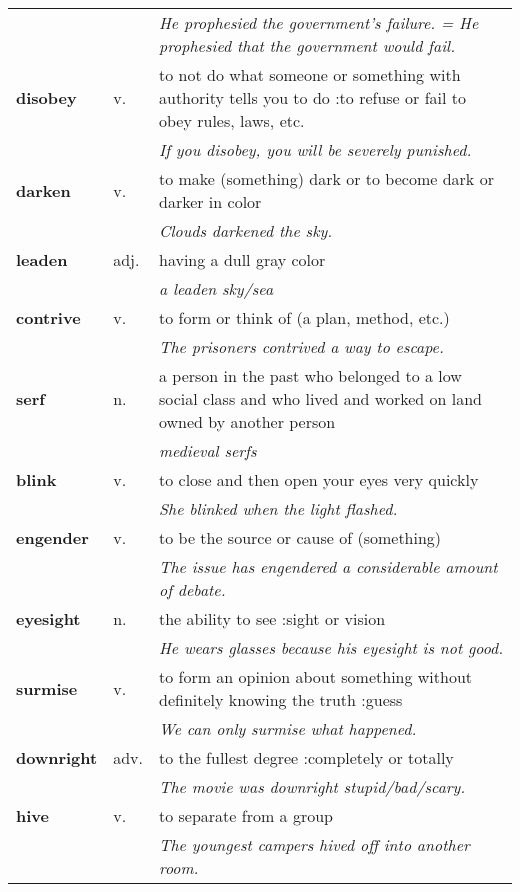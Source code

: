 \documentclass[a4paper]{article}
\begin{document}
\begin{longtable}{llp{11cm}}
 & & \textit{He prophesied the government's failure. = He prophesied that the government would fail.}\\[0.08cm]
\textbf{disobey} & v. &  to not do what someone or something with authority tells you to do :to refuse or fail to obey rules, laws, etc. \\
 & & \textit{If you disobey, you will be severely punished.}\\[0.08cm]
\textbf{darken} & v. &  to make (something) dark or to become dark or darker in color \\
 & & \textit{Clouds darkened the sky.}\\[0.08cm]
\textbf{leaden} & adj. &  having a dull gray color \\
 & & \textit{a leaden sky/sea}\\[0.08cm]
\textbf{contrive} & v. &  to form or think of (a plan, method, etc.) \\
 & & \textit{The prisoners contrived a way to escape.}\\[0.08cm]
\textbf{serf} & n. &  a person in the past who belonged to a low social class and who lived and worked on land owned by another person \\
 & & \textit{medieval serfs}\\[0.08cm]
\textbf{blink} & v. &  to close and then open your eyes very quickly \\
 & & \textit{She blinked when the light flashed.}\\[0.08cm]
\textbf{engender} & v. &  to be the source or cause of (something) \\
 & & \textit{The issue has engendered a considerable amount of debate.}\\[0.08cm]
\textbf{eyesight} & n. &  the ability to see :sight or vision \\
 & & \textit{He wears glasses because his eyesight is not good.}\\[0.08cm]
\textbf{surmise} & v. &  to form an opinion about something without definitely knowing the truth :guess \\
 & & \textit{We can only surmise what happened.}\\[0.08cm]
\textbf{downright} & adv. &  to the fullest degree :completely or totally \\
 & & \textit{The movie was downright stupid/bad/scary.}\\[0.08cm]
\textbf{hive} & v. &  to separate from a group \\
 & & \textit{The youngest campers hived off into another room.}\\[0.08cm]

\end{longtable}
\end{document}
